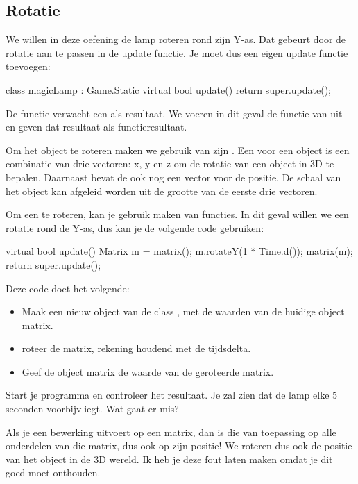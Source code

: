 \subsection{Rotatie}
We willen in deze oefening de lamp roteren rond zijn Y-as. Dat gebeurt door de rotatie aan te passen in de update functie. Je moet dus een eigen update functie toevoegen:

\begin{code}
class magicLamp : Game.Static
{
   virtual bool update()
   {
      return super.update();
   }
}
\end{code}

De functie verwacht een  als resultaat. We voeren in dit geval de  functie van  uit en geven dat resultaat als functieresultaat.

Om het object te roteren maken we gebruik van zijn . Een  voor een object is een combinatie van drie vectoren: x, y en z om de rotatie van een object in 3D te bepalen. Daarnaast bevat de  ook nog een vector voor de positie. De schaal van het object kan afgeleid worden uit de grootte van de eerste drie vectoren.

Om een  te roteren, kan je gebruik maken van  functies. In dit geval willen we een rotatie rond de Y-as, dus kan je de volgende code gebruiken:

\begin{code}
virtual bool update()
{
	Matrix m = matrix();
	m.rotateY(1 * Time.d());
	matrix(m);
	return super.update();
}
\end{code}

Deze code doet het volgende:
\begin{itemize}
	\item Maak een nieuw object van de class , met de waarden van de huidige object matrix.
	\item roteer de matrix, rekening houdend met de tijdsdelta.
	\item Geef de object matrix de waarde van de geroteerde matrix.
\end{itemize}

Start je programma en controleer het resultaat. Je zal zien dat de lamp elke 5 seconden voorbijvliegt. Wat gaat er mis?

Als je een bewerking uitvoert op een matrix, dan is die van toepassing op alle onderdelen van die matrix, dus ook op zijn positie! We roteren dus ook de positie van het object in de 3D wereld. Ik heb je deze fout laten maken omdat je dit goed moet onthouden.

